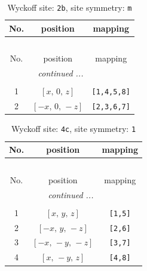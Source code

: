 \documentclass[fleqn,8pt]{jsarticle}
\begin{document}
\begin{longtable}{ccc}
\caption{Wyckoff site: {\tt 2b}, site symmetry: {\tt m}}
 \\
 \hline \hline
No. & position & mapping \\ \hline \endfirsthead

\multicolumn{2}{l}{\tablename\ \thetable{}} \\
 \hline \hline
No. & position & mapping \\ \hline \endhead

 \hline \hline
\multicolumn{2}{r}{\footnotesize\it continued ...} \\ \endfoot

 \hline \hline
\multicolumn{2}{r}{} \\ \endlastfoot

1 & $\left[ x,\, 0,\, z \right]$ & {\tt [1,4,5,8]} \\ \hline
2 & $\left[ - x,\, 0,\, - z \right]$ & {\tt [2,3,6,7]} \\
\end{longtable}
\renewcommand{\arraystretch}{1.2}
\begin{longtable}{ccc}
\caption{Wyckoff site: {\tt 4c}, site symmetry: {\tt 1}}
 \\
 \hline \hline
No. & position & mapping \\ \hline \endfirsthead

\multicolumn{2}{l}{\tablename\ \thetable{}} \\
 \hline \hline
No. & position & mapping \\ \hline \endhead

 \hline \hline
\multicolumn{2}{r}{\footnotesize\it continued ...} \\ \endfoot

 \hline \hline
\multicolumn{2}{r}{} \\ \endlastfoot

1 & $\left[ x,\, y,\, z \right]$ & {\tt [1,5]} \\ \hline
2 & $\left[ - x,\, y,\, - z \right]$ & {\tt [2,6]} \\ \hline
3 & $\left[ - x,\, - y,\, - z \right]$ & {\tt [3,7]} \\ \hline
4 & $\left[ x,\, - y,\, z \right]$ & {\tt [4,8]} \\
\end{longtable}
\end{document}
